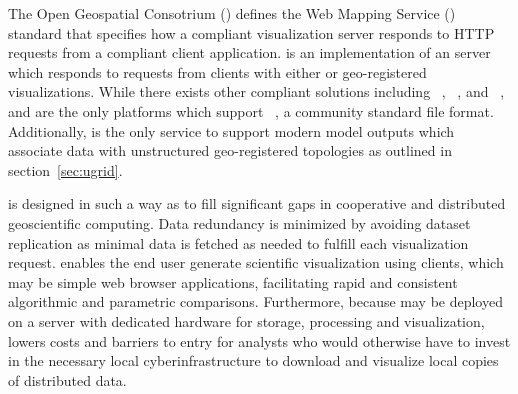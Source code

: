 The Open Geospatial Consotrium (\ogc{}) defines the Web Mapping
Service (\wms{})~\cite{wms14} standard that specifies how a compliant
visualization server responds to HTTP requests from a \wms{} compliant
client application. \sciwms{} is an implementation of an \ogcwms{}
server which responds to requests from clients with either \metadata{}
or geo-registered visualizations.  While there exists other \ogcwms{}
compliant solutions including \ncwms{}~\cite{blower13},
\mapserver{}~\cite{mapserver14}, and \geoserver{}~\cite{geoserver14},
\sciwms{} and \ncwms{} are the only platforms which support
\netcdf{}~\cite{netcdf}, a community standard file
format. Additionally, \sciwms{} is the only \ogcwms{} service to
support modern model outputs which associate data with unstructured
geo-registered topologies as outlined in section~\ref{sec:ugrid}.

\sciwms{} is designed in such a way as to fill significant gaps in
cooperative and distributed geoscientific computing. Data redundancy
is minimized by avoiding dataset replication as minimal data is
fetched as needed to fulfill each visualization request. \sciwms{}
enables the end user generate scientific visualization using \wms{}
clients, which may be simple web browser applications, facilitating
rapid and consistent algorithmic and parametric
comparisons. Furthermore, because \sciwms{} may be deployed on a
server with dedicated hardware for storage, processing and
visualization, \sciwms{} lowers costs and barriers to entry for
analysts who would otherwise have to invest in the necessary local
cyberinfrastructure to download and visualize local copies of
distributed data.

